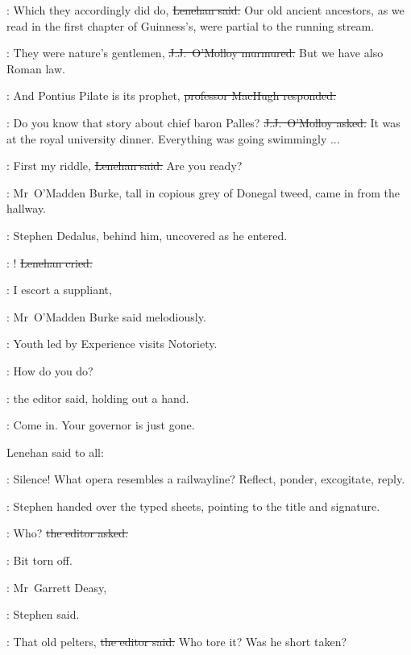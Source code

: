 \lenehan:
Which they accordingly did do,
\sout{Lenehan said.}
Our old ancient ancestors,
as we read in the first chapter of Guinness's,
were partial to the running stream.

\jjom:
They were nature's gentlemen,
\sout{J.J.~O'Molloy murmured.}
But we have also Roman law.

\machugh:
And Pontius Pilate is its prophet,
\sout{professor MacHugh responded.}

\jjom:
Do you know that story about chief baron Palles?
\sout{J.J.~O'Molloy asked.}
It was at the royal university dinner.
Everything was going swimmingly ...

\lenehan:
First my riddle,
\sout{Lenehan said.}
Are you ready?

:
Mr~O'Madden Burke,
tall in copious grey of Donegal tweed,
came in from the hallway.

:
Stephen Dedalus,
behind him,
uncovered as he entered.

\lenehan:
!
\sout{Lenehan cried.}

\omaddenburke:
I escort a suppliant,

:
Mr~O'Madden Burke said melodiously.

\omaddenburke:
Youth led by Experience visits Notoriety.

\crawford:
How do you do?

:
the editor said,
holding out a hand.

\crawford:
Come in.
Your governor is just gone.



Lenehan said to all:

\lenehan:
Silence!
What opera resembles a railwayline?
Reflect,
ponder,
excogitate,
reply.

:
Stephen handed over the typed sheets,
pointing to the title and signature.

\crawford:
Who?
\sout{the editor asked.}

\StephenInt:
Bit torn off.

\Stephen:
Mr~Garrett Deasy,

:
Stephen said.

\crawford:
That old pelters,
\sout{the editor said.}
Who tore it?
Was he short taken?



